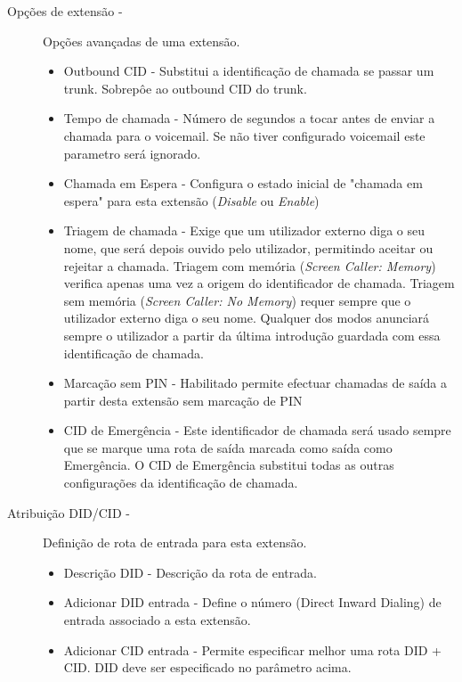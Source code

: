 \begin{description}
\begin{description}
            \item[Opções de extensão -] Opções avançadas de uma extensão.
                \begin{itemize}
                    \item Outbound CID - Substitui a identificação de chamada se passar um trunk. Sobrepôe ao outbound CID do trunk.
                    \item Tempo de chamada - Número de segundos a tocar antes de enviar a chamada para o voicemail. Se não tiver configurado voicemail este parametro será ignorado.
                    \item Chamada em Espera - Configura o estado inicial de "chamada em espera" para esta extensão (\emph{Disable} ou \emph{Enable})
                    \item Triagem de chamada - Exige que um utilizador externo diga o seu nome, que será depois ouvido pelo utilizador, permitindo aceitar ou rejeitar a chamada. Triagem com memória (\emph{Screen Caller: Memory}) verifica apenas uma vez a origem do identificador de chamada. Triagem sem memória (\emph{Screen Caller: No Memory}) requer sempre que o utilizador externo diga o seu nome. Qualquer dos modos anunciará sempre o utilizador a partir da última introdução guardada com essa identificação de chamada.
                    \item Marcação sem PIN - Habilitado permite efectuar chamadas de saída a partir desta extensão sem marcação de PIN
                    \item CID de Emergência - Este identificador de chamada será usado sempre que se marque uma rota de saída marcada como saída como Emergência. O CID de Emergência substitui todas as outras configurações da identificação de chamada.
                \end{itemize}

            \item[Atribuição DID/CID -] Definição de rota de entrada para esta extensão.
                \begin{itemize}
                    \item Descrição DID - Descrição da rota de entrada.
                    \item Adicionar DID entrada - Define o número (Direct Inward Dialing) de entrada associado a esta extensão.
                    \item Adicionar CID entrada - Permite especificar melhor uma rota DID + CID. DID deve ser especificado no parâmetro acima.
                \end{itemize}


\end{description}
\end{description}
